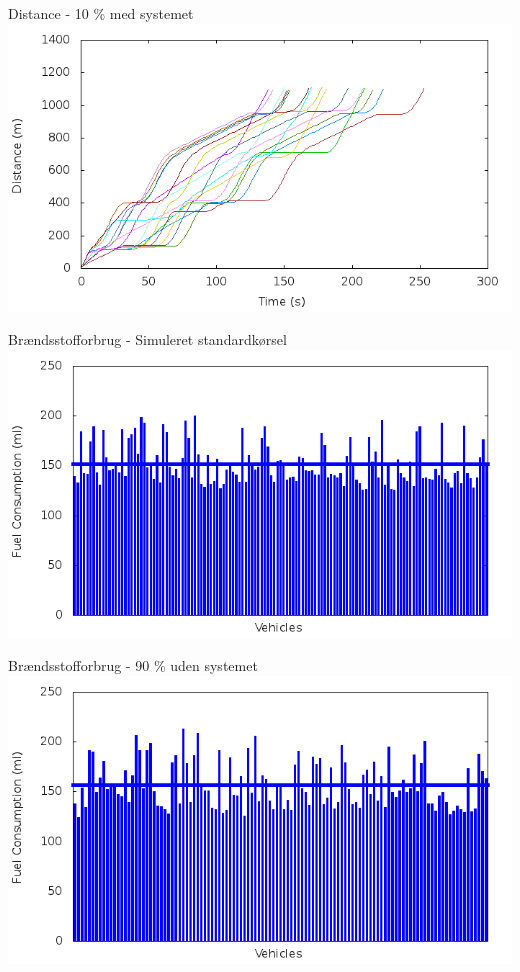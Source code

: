 \begin{frame}{Distance - 10 \% med systemet}
\includegraphics[width=1\textwidth]{../Article/images/tp0/distanceControlled10.png}
\end{frame}

\begin{frame}{Brændsstofforbrug - Simuleret standardkørsel}
\includegraphics[width=1\textwidth]{../Article/images/tp0/fuelRouteUncontrolled0.png}
\end{frame}


\begin{frame}{Brændsstofforbrug - 90 \% uden systemet}
\includegraphics[width=1\textwidth]{../Article/images/tp0/fuelRouteUncontrolled10.png}
\end{frame}

